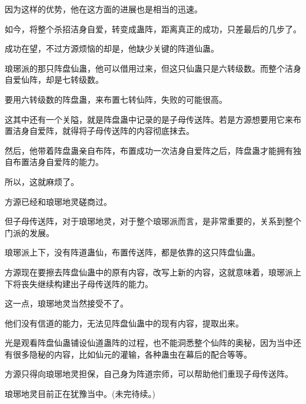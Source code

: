 \begin{this_body}
因为这样的优势，他在这方面的进展也是相当的迅速。

如今，将整个杀招洁身自爱，转变成蛊阵，距离真正的成功，只差最后的几步了。

成功在望，不过方源烦恼的却是，他缺少关键的阵道仙蛊。

琅琊派的那只阵盘仙蛊，他可以借用过来，但这只仙蛊只是六转级数。而整个洁身自爱仙阵，却是七转级数。

要用六转级数的阵盘蛊，来布置七转仙阵，失败的可能很高。

这其中还有一个关隘，就是阵盘蛊中记录的是子母传送阵。若是方源想要用它来布置洁身自爱阵，就得将子母传送阵的内容彻底抹去。

然后，他带着阵盘蛊亲自布阵，布置成功一次洁身自爱阵之后，阵盘蛊才能拥有独自布置洁身自爱阵的能力。

所以，这就麻烦了。

方源已经和琅琊地灵磋商过。

但子母传送阵，对于琅琊地灵，对于整个琅琊派而言，是非常重要的，关系到整个门派的发展。

琅琊派上下，没有阵道蛊仙，布置传送阵，都是依靠的这只阵盘仙蛊。

方源现在要擦去阵盘仙蛊中的原有内容，改写上新的内容，这就意味着，琅琊派上下将丧失继续构建出子母传送阵的能力。

这一点，琅琊地灵当然接受不了。

他们没有信道的能力，无法见阵盘仙蛊中的现有内容，提取出来。

光是观看阵盘仙蛊铺设仙道蛊阵的过程，也不能洞悉整个仙阵的奥秘，因为当中还有很多隐秘的内容，比如仙元的灌输，各种蛊虫在幕后的配合等等。

方源只得向琅琊地灵担保，自己身为阵道宗师，可以帮助他们重现子母传送阵。

琅琊地灵目前正在犹豫当中。(未完待续。)

\end{this_body}

